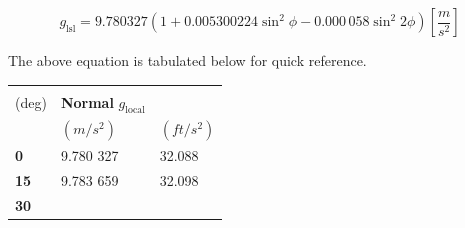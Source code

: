 \documentclass[
]{book}
\begin{document}
\[
g_{\mathrm{lsl}} = 9.780 327 \left( 1 + 0.005 300 224 \sin^2{\phi} - 0.000\,058 \sin^2{2 \phi} \right) \left[ \frac{m}{s^2} \right]
\]

The above equation is tabulated below for quick reference.

\begin{longtable}[]{@{}lll@{}}
\toprule
\begin{minipage}[b]{0.18\columnwidth}\raggedright
\textbf{Latitude\\
(deg)}\strut
\end{minipage} & \begin{minipage}[b]{0.30\columnwidth}\raggedright
\textbf{Normal}
\(g_{\mathrm{local}}\)\strut
\end{minipage} & \begin{minipage}[b]{0.25\columnwidth}\raggedright
\strut
\end{minipage}\tabularnewline
\midrule
\endhead
\begin{minipage}[t]{0.18\columnwidth}\raggedright
\strut
\end{minipage} & \begin{minipage}[t]{0.30\columnwidth}\raggedright
\((m/s^2)\)\strut
\end{minipage} & \begin{minipage}[t]{0.25\columnwidth}\raggedright
\((ft/s^2)\)\strut
\end{minipage}\tabularnewline
\begin{minipage}[t]{0.18\columnwidth}\raggedright
\textbf{0}\strut
\end{minipage} & \begin{minipage}[t]{0.30\columnwidth}\raggedright
9.780 327\strut
\end{minipage} & \begin{minipage}[t]{0.25\columnwidth}\raggedright
32.088\strut
\end{minipage}\tabularnewline
\begin{minipage}[t]{0.18\columnwidth}\raggedright
\textbf{15}\strut
\end{minipage} & \begin{minipage}[t]{0.30\columnwidth}\raggedright
9.783 659\strut
\end{minipage} & \begin{minipage}[t]{0.25\columnwidth}\raggedright
32.098\strut
\end{minipage}\tabularnewline
\begin{minipage}[t]{0.18\columnwidth}\raggedright
\textbf{30}\strut
\end{minipage} & \begin{minipage}[t]{0.30\columnwidth}\raggedright

\end{minipage}
\end{longtable}
\end{document}
